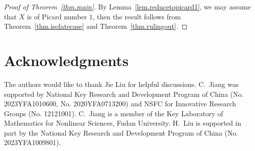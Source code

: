 \documentclass[12pt,twoside]{amsart}
\theoremstyle{definition}
\begin{document}
\begin{proof}[Proof of Theorem~\ref{thm.main}]
    By Lemma~\ref{lem.reducetopicard1}, we may assume that $X$ is of Picard number $1$, then the result follows from Theorem~\ref{thm.isolatecase} and Theorem~\ref{thm.rulingout}.
\end{proof}




\section*{Acknowledgments} 
The authors would like to thank Jie Liu for helpful discussions. C.~Jiang was supported by National Key Research and Development Program of China (No. 2023YFA1010600, No. 2020YFA0713200) and NSFC for Innovative Research Groups (No. 12121001). C.~Jiang is a member of the Key Laboratory of Mathematics for Nonlinear Sciences, Fudan University. H.~Liu is supported in part by the National Key Research and Development Program of China (No. 2023YFA1009801).  
\end{document}
